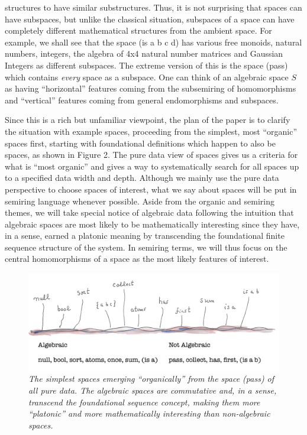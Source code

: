 \documentclass[11pt]{article}
\begin{document}
\begin{itemize}
{structures to have similar substructures.  Thus, it is not surprising that spaces can have subspaces, but unlike the classical situation, 
subspaces of a space can have completely different mathematical structures from the ambient space.  For example, we shall see that 
the space (is a b c d) has various free monoids, natural numbers, integers, the algebra of 4x4 natural number matrices and 
Gaussian Integers as different subspaces.  The extreme version of this is the space (pass) which contains {\it every} space as a subspace.  One can think of 
an algebraic space $S$ as having ``horizontal'' features coming from the subsemiring of homomorphisms and ``vertical'' features 
coming from general endomorphisms and subspaces.} 
\end{itemize}
Since this is a rich but unfamiliar 
viewpoint, the plan of the paper is to clarify the situation with example spaces, proceeding 
from the simplest, most ``organic'' spaces first, starting with foundational definitions which happen to also 
be spaces, as shown in Figure 2.  The pure data view of spaces gives us a criteria for what is ``most organic'' and gives a way to systematically 
search for all spaces up to a specified data width and depth.  Although we mainly use the pure data perspective to 
choose spaces of interest, what we say about spaces will be put in semiring language whenever possible.  Aside from 
the organic and semiring themes, we will take special notice of algebraic data following the intuition that algebraic 
spaces are most likely to be mathematically interesting since they have, in a sense, earned a platonic meaning by 
transcending the foundational finite sequence structure of the system.  In semiring terms, we will thus focus on
the central homomorphisms of a space as the most likely features of interest. 

\begin{figure}[h]
\centering
\includegraphics[width=1.0\textwidth]{start-garden.png}
\caption{{\it The simplest spaces emerging ``organically'' from the space (pass) of all pure data.  The algebraic spaces are commutative and, 
in a sense, transcend the foundational sequence concept, making them more ``platonic'' and more mathematically interesting than non-algebraic spaces.}} 
\end{figure}
\end{document}

